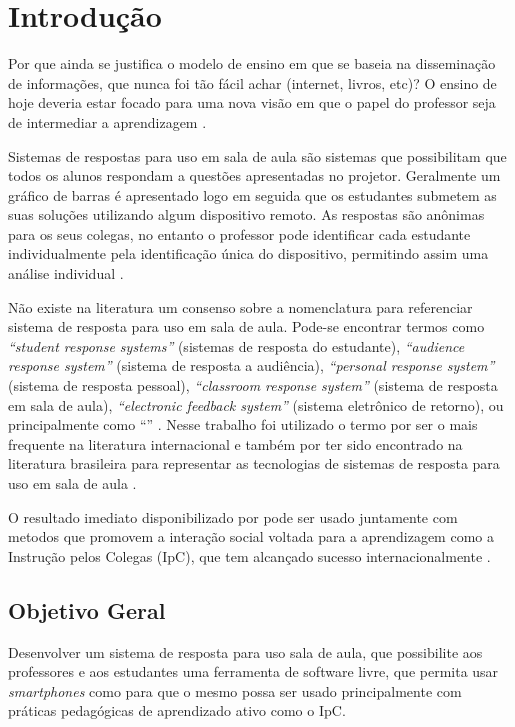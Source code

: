 \chapter{Introdução}

Por que ainda se justifica o modelo de ensino em que se baseia
na disseminação de informações, que nunca foi tão fácil achar (internet,
livros, etc)? O ensino de hoje deveria estar focado para uma nova
visão em que o papel do professor seja de intermediar a aprendizagem \cite{Araujo2013}.

Sistemas de respostas para uso em sala de aula são sistemas que possibilitam que todos os alunos
respondam a questões apresentadas no projetor. Geralmente um gráfico de barras
é apresentado logo em seguida que os estudantes submetem as suas soluções
utilizando algum dispositivo remoto. As respostas são anônimas para os seus colegas,
no entanto o professor pode identificar cada estudante individualmente pela
identificação única do dispositivo, permitindo assim uma análise individual \cite{Kay2009}.

Não existe na literatura um consenso sobre a nomenclatura para referenciar sistema de
resposta para uso em sala de aula. Pode-se encontrar termos como
{\textit{``student response systems''}} (sistemas de resposta do estudante),
{\textit{``audience response system''}} (sistema de resposta a audiência),
{\textit{``personal response system''}} (sistema de resposta pessoal),
{\textit{``classroom response system''}} (sistema de resposta em sala de aula),
{\textit{``electronic feedback system''}} (sistema eletrônico de retorno),
ou principalmente como {``\clickers''} \cite{Hunsu2016}.
Nesse trabalho foi utilizado o termo {\clickers} por ser o mais frequente na literatura internacional
e também por ter sido encontrado na literatura brasileira para representar as tecnologias de sistemas
de resposta para uso em sala de aula \cite{Mattos2015, Araujo2013}.

O resultado imediato disponibilizado por {\clickers} pode ser usado juntamente
com metodos que promovem a interação social voltada para a aprendizagem como a
Instrução pelos Colegas (IpC), que tem alcançado sucesso internacionalmente \cite{Araujo2013}.

\section{Objetivo Geral}
Desenvolver um sistema de resposta para uso sala de aula,
que possibilite aos professores e aos estudantes uma ferramenta de software livre,
que permita usar {\textit{smartphones}} como {\clickers} para que o mesmo possa
ser usado principalmente com práticas pedagógicas de aprendizado ativo como o IpC.

